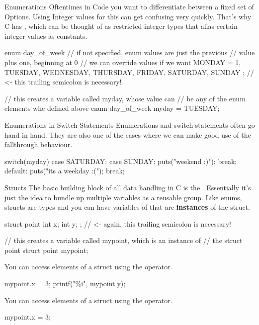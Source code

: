 \documentclass[10pt,graphics,aspectratio=169,table]{beamer}
\begin{document}
\begin{frame}[fragile]{Enumerations}
    Oftentimes in Code you want to differentiate between a fixed set of Options.
    Using Integer values for this can get confusing very quickly. That's why
    C has , which can be thought of as restricted integer types 
    that alias certain integer values as constants.
    \begin{codeblock}
enum day_of_week{
    // if not specified, enum values are just the previous
    // value plus one, beginning at 0
    // we can override values if we want  
    MONDAY = 1,  
    TUESDAY, WEDNESDAY, THURSDAY,
    FRIDAY, SATURDAY, SUNDAY
}; // <- this trailing semicolon is necessary!

// this creates a variable called myday, whose value can
// be any of the enum elements whe defined above
enum day_of_week myday = TUESDAY; 
    \end{codeblock}
\end{frame}

\begin{frame}[fragile]{Enumerations in Switch Statements}
    Enumerations and switch statements often go hand in hand.
    They are also one of the cases where we can make good use of the
    fallthrough behaviour.
    \begin{codeblock}
switch(myday){
    case SATURDAY: 
    case SUNDAY: {
        puts("weekend :)");
    } break;
    default: {
        puts("its a weekday :("); 
    } break;
}
    \end{codeblock}
\end{frame}

\begin{frame}[fragile]{Structs}
    The basic building block of all data handling in C is the .
    Essentially it's just the idea to bundle up multiple variables as a reusable
    group. Like enums, structs are types and you can have variables of 
    that are \textbf{instances} of the struct.
    \begin{codeblock}
struct point{
    int x;
    int y;
}; // <- again, this trailing semicolon is necessary!

// this creates a variable called mypoint, which is an instance of
// the struct point
struct point mypoint;
    \end{codeblock}

    You can access elements of a struct using the  operator.
    \begin{codeblock}
mypoint.x = 3;
printf("\%i\n", mypoint.y);
    \end{codeblock}

    You can access elements of a struct using the  operator.
    \begin{codeblock}
mypoint.x = 3;
    \end{codeblock}
    
\end{frame}
\end{document}
